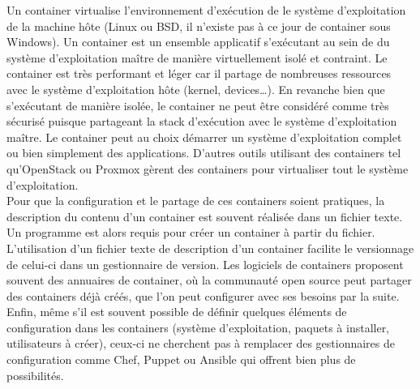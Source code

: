         Un container virtualise l'environnement d'exécution de le système d'exploitation de la machine hôte (Linux ou BSD, il n'existe pas à ce jour de container sous Windows). Un container est un ensemble applicatif s'exécutant au sein de du système d'exploitation maître de manière virtuellement isolé et contraint. Le container est très performant et léger car il partage de nombreuses ressources avec le système d'exploitation hôte (kernel, devices\dots). En revanche bien que s'exécutant de manière isolée, le container ne peut être considéré comme très sécurisé puisque partageant la stack d'exécution avec le système d'exploitation maître. Le container peut au choix démarrer un système d'exploitation complet ou bien simplement des applications. D'autres outils utilisant des containers tel qu'OpenStack ou Proxmox gèrent des containers pour virtualiser tout le système d'exploitation.\\

        Pour que la configuration et le partage de ces containers soient pratiques, la description du contenu d'un container est souvent réalisée dans un fichier texte. Un programme est alors requis pour créer un container à partir du fichier. L'utilisation d'un fichier texte de description d'un container facilite le versionnage de celui-ci dans un gestionnaire de version. Les logiciels de containers proposent souvent des annuaires de container, où la communauté open source peut partager des containers déjà créés, que l'on peut configurer avec ses besoins par la suite.\\

        Enfin, même s'il est souvent possible de définir quelques éléments de configuration dans les containers (système d'exploitation, paquets à installer, utilisateurs à créer), ceux-ci ne cherchent pas à remplacer des gestionnaires de configuration comme Chef, Puppet ou Ansible qui offrent bien plus de possibilités.